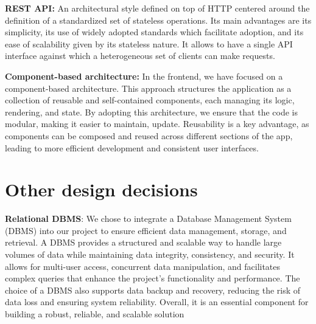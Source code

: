 \textbf{REST API:}
An architectural style defined on top of HTTP centered around the definition of a standardized set of stateless operations. Its main advantages are its simplicity, its use of widely adopted standards which facilitate adoption, and its ease of scalability given by its stateless nature. It allows to have a single API interface against which a heterogeneous set of clients can make requests.

\textbf{Component-based architecture:}
In the frontend, we have focused on a component-based architecture. This approach structures the application as a collection of reusable and self-contained components, each managing its logic, rendering, and state. By adopting this architecture, we ensure that the code is modular, making it easier to maintain, update. Reusability is a key advantage, as components can be composed and reused across different sections of the app, leading to more efficient development and consistent user interfaces.


\section{Other design decisions}

\textbf{Relational DBMS}: 
We chose to integrate a Database Management System (DBMS) into our project to ensure efficient data management, storage, and retrieval. A DBMS provides a structured and scalable way to handle large volumes of data while maintaining data integrity, consistency, and security. It allows for multi-user access, concurrent data manipulation, and facilitates complex queries that enhance the project's functionality and performance. The choice of a DBMS also supports data backup and recovery, reducing the risk of data loss and ensuring system reliability. Overall, it is an essential component for building a robust, reliable, and scalable solution